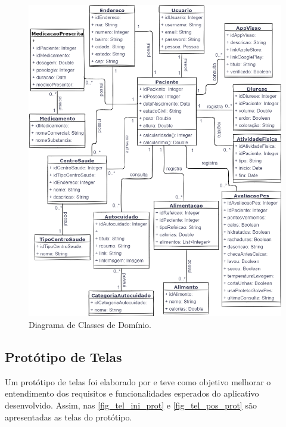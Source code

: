 \begin{figure}[htb]
    \caption{\label{fig_class_dom}Diagrama de Classes de Domínio.}
    \begin{center}
        \includegraphics[scale=0.6]{Imagens/proposta/diagrama_classes.png}
    \end{center}
\end{figure}

\newpage

\subsection{Protótipo de Telas}

Um protótipo de telas foi elaborado por  e teve como objetivo
melhorar o entendimento dos requisitos e funcionalidades esperados do aplicativo desenvolvido.
Assim, nas \autoref{fig_tel_ini_prot} e \autoref{fig_tel_pos_prot} são apresentadas as telas do protótipo.

